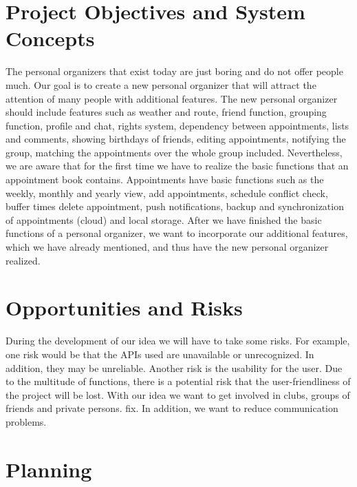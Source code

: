 \documentclass[12pt]{scrartcl}
\begin{document}
    \pagebreak

    \section{Project Objectives and System Concepts}
        The personal organizers that exist today are just boring and do not offer people much. 
        Our goal is to create a new personal organizer that will attract the attention of many people with additional features.
        The new personal organizer should include features such as weather and route, friend function, grouping function, 
        profile and chat, rights system, dependency between appointments, lists and comments, showing birthdays of friends,
        editing appointments, notifying the group, matching the appointments over the whole group included.
        Nevertheless, we are aware that for the first time we have to realize the basic functions that an appointment book contains.
        Appointments have basic functions such as the weekly, monthly and yearly view, add appointments, schedule conflict check, buffer times
        delete appointment, push notifications, backup and synchronization of appointments (cloud) and local storage.
        After we have finished the basic functions of a personal organizer, we want to incorporate our additional features, which we have already mentioned, 
        and thus have the new personal organizer realized.
    \pagebreak

    \section{Opportunities and Risks}
        During the development of our idea we will have to take some risks. For example, one risk would be that the APIs used are unavailable or unrecognized. In addition, they may be unreliable.
        Another risk is the usability for the user. Due to the multitude of functions, there is a potential risk that the user-friendliness of the project will be lost. 
        With our idea we want to get involved in clubs, groups of friends and private persons.
        fix. In addition, we want to reduce communication problems.
    \pagebreak

    \section{Planning}

    \vspace*{15pt}
\end{document}
